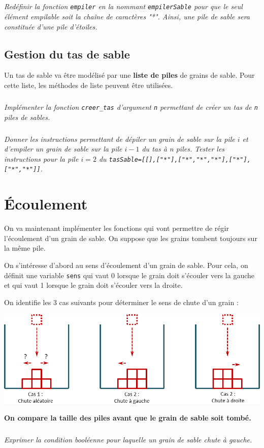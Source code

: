 \documentclass[10pt,fleqn]{article} %
\begin{document}
\begin{multicols}{2}
\subparagraph{}
\textit{Redéfinir la fonction \texttt{empiler} en la nommant \texttt{empilerSable} pour que le seul élément empilable soit la chaîne de caractères "*". Ainsi, une pile de sable sera constituée d'une pile d'étoiles. }

\subsection*{Gestion du tas de sable}
Un tas de sable va être modélisé par une \textbf{liste de piles} de grains de sable. Pour cette liste, les méthodes de liste peuvent être utilisées.

\subparagraph{}\textit{Implémenter la fonction \texttt{creer\_tas} d'argument \texttt{n} permettant de créer un tas de \texttt{n} piles de sables.}

\subparagraph{}\textit{Donner les instructions permettant de dépiler un grain de sable sur la pile $i$ et d'empiler un grain de sable sur la pile $i-1$ du tas à n piles. Tester les instructions pour la pile $i=2$ du \texttt{tasSable=[[],["*"],["*","*","*"],["*"],["*","*"]]}.}
\section*{Écoulement}
On va maintenant implémenter les fonctions qui vont permettre de régir l'écoulement d'un grain de sable. On suppose que les grains tombent toujours sur la même pile. 

On s'intéresse d'abord au sens d'écoulement d'un grain de sable. Pour cela, on définit une variable \texttt{sens} qui vaut 0 lorsque le grain doit s'écouler vers la gauche et qui vaut 1 lorsque le grain doit s'écouler vers la droite.

On identifie les 3 cas suivants pour déterminer le sens de chute d'un grain :
\begin{center}
\includegraphics[width=\linewidth]{images/sablier_03}
\end{center}
\textbf{On compare la taille des piles avant que le grain de sable soit tombé.
}
\subparagraph{}
\textit{Exprimer la condition booléenne pour laquelle un grain de sable chute à gauche.}


\end{multicols}
\end{document}
